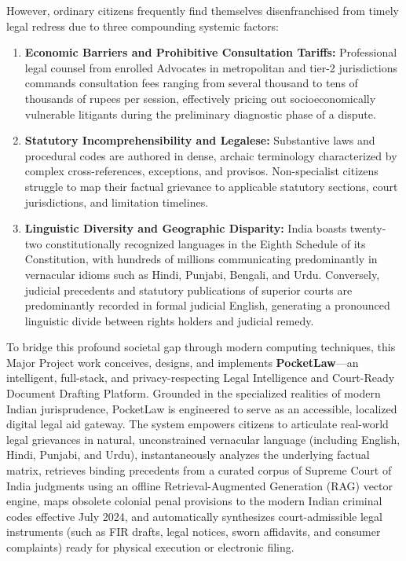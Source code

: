 However, ordinary citizens frequently find themselves disenfranchised from timely legal redress due to three compounding systemic factors:
\begin{enumerate}
    \item \textbf{Economic Barriers and Prohibitive Consultation Tariffs:} Professional legal counsel from enrolled Advocates in metropolitan and tier-2 jurisdictions commands consultation fees ranging from several thousand to tens of thousands of rupees per session, effectively pricing out socioeconomically vulnerable litigants during the preliminary diagnostic phase of a dispute.
    \item \textbf{Statutory Incomprehensibility and Legalese:} Substantive laws and procedural codes are authored in dense, archaic terminology characterized by complex cross-references, exceptions, and provisos. Non-specialist citizens struggle to map their factual grievance to applicable statutory sections, court jurisdictions, and limitation timelines.
    \item \textbf{Linguistic Diversity and Geographic Disparity:} India boasts twenty-two constitutionally recognized languages in the Eighth Schedule of its Constitution, with hundreds of millions communicating predominantly in vernacular idioms such as Hindi, Punjabi, Bengali, and Urdu. Conversely, judicial precedents and statutory publications of superior courts are predominantly recorded in formal judicial English, generating a pronounced linguistic divide between rights holders and judicial remedy.
\end{enumerate}

To bridge this profound societal gap through modern computing techniques, this Major Project work conceives, designs, and implements \textbf{PocketLaw}---an intelligent, full-stack, and privacy-respecting Legal Intelligence and Court-Ready Document Drafting Platform. Grounded in the specialized realities of modern Indian jurisprudence, PocketLaw is engineered to serve as an accessible, localized digital legal aid gateway. The system empowers citizens to articulate real-world legal grievances in natural, unconstrained vernacular language (including English, Hindi, Punjabi, and Urdu), instantaneously analyzes the underlying factual matrix, retrieves binding precedents from a curated corpus of Supreme Court of India judgments using an offline Retrieval-Augmented Generation (RAG) vector engine, maps obsolete colonial penal provisions to the modern Indian criminal codes effective July 2024, and automatically synthesizes court-admissible legal instruments (such as FIR drafts, legal notices, sworn affidavits, and consumer complaints) ready for physical execution or electronic filing.

